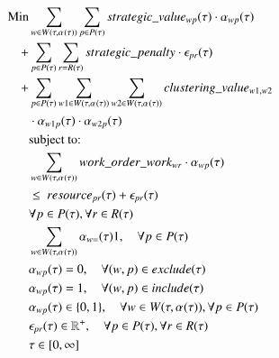 \begin{alignat}{2}
\text{Min} &\sum_{w \in W(\tau, \alpha_{}(\tau))} \sum_{p \in P(\tau)} strategic\_value_{wp}(\tau) \cdot \alpha_{wp}(\tau)                                                                                      \\ 
	+ & \sum_{p \in P(\tau)} \sum_{r = R(\tau)} strategic\_penalty \cdot \epsilon_{pr}(\tau)                                                                                                                                  \\
+ & \sum_{p \in P(\tau)} \sum_{w1 \in W(\tau, \alpha_{}(\tau))} \sum_{w2 \in W(\tau, \alpha_{}(\tau))} clustering\_value_{w1, w2} \notag                                                                                                   \\ 
	& \cdot \alpha_{w1p}(\tau) \cdot \alpha_{w2p}(\tau)                                                                                 \label{eqn:objective_function_strategic} \\
    & \text{subject to:} \notag                                                                                                                                                                                      \\
& \sum_{w \in W(\tau, \alpha_{}(\tau))} work\_order\_work_{wr} \cdot \alpha_{wp}(\tau) \notag \\ 
	& \leq \ resource_{pr}(\tau) + \epsilon_{pr}(\tau) \notag                                                                       \\ 
	& \forall p \in P(\tau), \forall r \in R(\tau)                                                                                                                  \label{eqn:capacity_constraint}          \\
& \sum_{w \in W(\tau, \alpha_{}(\tau))} \alpha_{w=}(\tau) 1                                              , \quad \forall p \in P(\tau)                      \label{eqn:single_workorder_constraint}  \\
	& \alpha_{wp}(\tau) = 0                                                             , \quad \forall (w, p) \in exclude(\tau)                          \label{eqn:exclusion_constraint}  \\
	& \alpha_{wp}(\tau) = 1                                                             , \quad \forall (w, p) \in include(\tau)                          \label{eqn:inclusion_constraint}  \\
& \alpha_{wp}(\tau) \in \{0, 1\}                                                    , \quad \forall w \in W(\tau, \alpha_{}(\tau)), \forall p \in P(\tau)     \label{eqn:x_integrality_constraint}     \\ 
	& \epsilon_{pr}(\tau) \in \mathbb{R}^{+}                                         , \quad \forall p \in P(\tau), \forall r \in R(\tau)                           \label{eqn:p_non_negativity_constraint}  \\ 
    & \tau \in  [0, \infty] 
\end{alignat}
